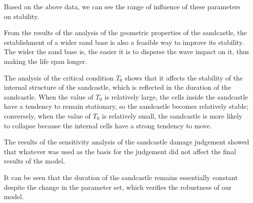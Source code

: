 \documentclass{mcmthesis}		    %
\begin{document}
	Based on the above data, we can see the range of influence of these parameters on stability.
	
    From the results of the analysis of the geometric properties of the sandcastle, the establishment of a wider sand base is also a feasible way to improve its stability. The wider the sand base is, the easier it is to disperse the wave impact on it, thus making the life span longer.
    
    The analysis of the critical condition $T_0$ shows that it affects the stability of the internal structure of the sandcastle, which is reflected in the duration of the sandcastle. When the value of $T_0$ is relatively large, the cells inside the sandcastle have a tendency to remain stationary, so the sandcastle becomes relatively stable; conversely, when the value of $T_0$ is relatively small, the sandcastle is more likely to collapse because the internal cells have a strong tendency to move.
    
    The results of the sensitivity analysis of the sandcastle damage judgement showed that whatever was used as the basis for the judgement did not affect the final results of the model.

	It can be seen that the duration of the sandcastle remains essentially constant despite the change in the parameter set, which verifies the robustness of our model.
\end{document}

